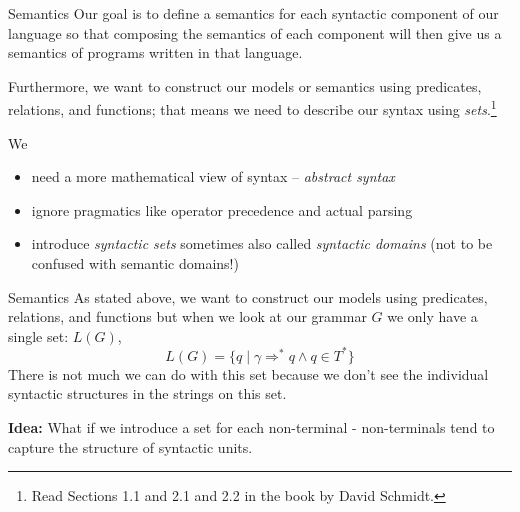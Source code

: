 \documentclass{beamer}
\begin{document}
\begin{frame}{Semantics}
Our goal is to define a semantics
for each syntactic component of our language so that composing the semantics of each component
will then give us a semantics of programs written in that language.

\vspace{.1in}
Furthermore,
we want to construct our models or semantics using predicates, relations, and functions; that means
we need to describe our syntax using {\em sets}.\footnote{\tiny Read Sections 1.1 and 2.1 and 2.2 in the book by David Schmidt.}

\vspace{.1in}

We
\begin{itemize}
\item need a more mathematical view of syntax -- {\em abstract syntax}
\item ignore pragmatics like operator precedence and actual  parsing
\item introduce  {\em syntactic sets} sometimes also called {\em syntactic domains}  (not to be confused with semantic domains!)
\end{itemize}

\end{frame}

\begin{frame}{Semantics}
As stated above, we want to construct our models using predicates, relations, and functions but when we look at our grammar $G$
we only have a single set: $L(G)$,
\[
L(G) = \{ q \mid \gamma \Rightarrow^* q \wedge q \in T^*\}
\]
There is not much we can do with this set because we don't see the individual syntactic structures in the strings on this set.

\vspace{.1in}

{\bf Idea:} What if we introduce a set for each non-terminal - non-terminals tend to capture the structure of syntactic units.
\end{frame}
\end{document}
